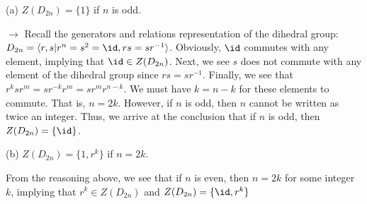 \documentclass[12pt,a4paper]{article}
\begin{document}
(a) $Z(D_{2n}) = \{1\}$ if $n$ is odd.

$\rightarrow$ Recall the generators and relations representation of the dihedral group: $D_{2n} = \langle r,s | r^n = s^2 = \id, rs = sr^{-1} \rangle$. Obviously, $\id$ commutes with any element, implying that $\id \in Z(D_{2n})$. Next, we see $s$ does not commute with any element of the dihedral group since $rs = sr^{-1}$. Finally, we see that $r^{k}sr^{m} = sr^{-k}r^{m} = sr^{m}r^{n-k}$. We must have $k = n-k$ for these elements to commute. That is, $n = 2k$. However, if $n$ is odd, then $n$ cannot be written as twice an integer. Thus, we arrive at the conclusion that if $n$ is odd, then $Z(D_{2n}) = \{\id\}$.

(b) $Z(D_{2n}) = \{1,r^k\}$ if $n = 2k$.

From the reasoning above, we see that if $n$ is even, then $n = 2k$ for some integer $k$, implying that $r^k \in Z(D_{2n})$ and  $Z(D_{2n}) = \{\id,r^k\}$
\end{document}
